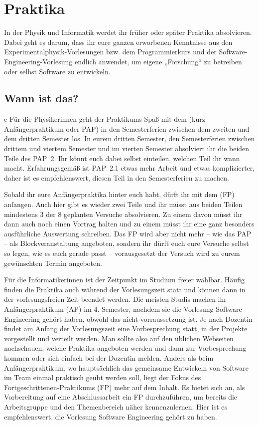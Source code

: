\section{Praktika}

In der Physik und Informatik werdet ihr früher oder später Praktika absolvieren. Dabei geht es darum, dass ihr eure ganzen erworbenen Kenntnisse aus den Experimentalphysik-Vorlesungen bzw. dem Programmierkurs und der Software-Engineering-Vorlesung endlich anwendet, um eigene „Forschung“ zu betreiben oder selbst Software zu entwickeln.

\subsection{Wann ist das?}
e
Für die Physikerinnen geht der Praktikums-Spaß mit dem  (kurz Anfängerpraktikum oder \gls{PAP}) in den Semesterferien zwischen dem zweiten und dem dritten Semester los. In eurem dritten Semester, den Semesterferien zwischen drittem und viertem Semester und im vierten Semester absolviert ihr die beiden Teile des PAP~2. Ihr könnt euch dabei selbst einteilen, welchen Teil ihr wann macht. Erfahrungsgemäß ist PAP~2.1 etwas mehr Arbeit und etwas komplizierter, daher ist es empfehlenswert, diesen Teil in den Semesterferien zu machen.

Sobald ihr eure Anfängerpraktika hinter euch habt, dürft ihr mit dem  (\gls{FP}) anfangen. Auch hier gibt es wieder zwei Teile und ihr müsst aus beiden Teilen mindestens 3 der 8 geplanten Versuche absolvieren. Zu einem davon müsst ihr dann auch noch einen Vortrag halten und zu einem müsst ihr eine ganz besonders ausführliche Auswertung schreiben. Das \gls{FP} wird aber nicht mehr -- wie das \gls{PAP} -- als Blockveranstaltung angeboten, sondern ihr dürft euch eure Versuche selbst so legen, wie es euch gerade passt -- vorausgesetzt der Versuch wird zu eurem gewünschten Termin angeboten.

Für die Informatikerinnen ist der Zeitpunkt im Studium freier wählbar. Häufig finden die Praktika auch während der Vorlesungszeit statt und können dann in der vorlesungsfreien Zeit beendet werden. Die meisten Studis machen ihr Anfängerpraktikum (\gls{AP}) im 4. Semester, nachdem sie die Vorlesung Software Engineering gehört haben, obwohl das nicht vorraussetzung ist. Je nach Dozentin findet am Anfang der Vorlesungszeit eine Vorbesprechung statt, in der Projekte vorgestellt und verteilt werden. Man sollte also auf den üblichen Webseiten nachschauen, welche Praktika angeboten werden und dann zur Vorbesprechung kommen oder sich einfach bei der Dozentin melden.
Anders als beim Anfängerpraktikum, wo hauptsächlich das gemeinsame Entwickeln von Software im Team einmal praktisch geübt werden soll, liegt der Fokus des Fortgeschrittenen-Praktikums (\gls{FP}) mehr auf dem Inhalt. Es bietet sich an, als Vorbereitung auf eine Abschlussarbeit ein FP durchzuführen, um bereits die Arbeitsgruppe und den Themenbereich näher kennenzulernen. Hier ist es empfehlenswert, die Vorlesung Software Engineering gehört zu haben.

